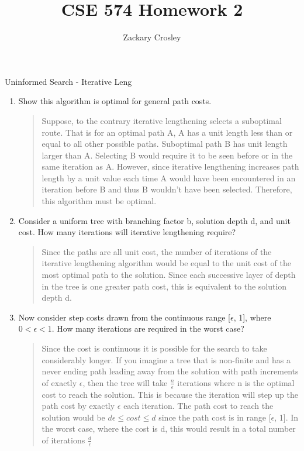 \documentclass[11pt]{article}
\newenvironment{problem}[2][Problem]{\begin{trivlist}
\item[\hskip \labelsep {\bfseries #1}\hskip \labelsep {\bfseries #2.}]}{\end{trivlist}}
\begin{document}
\title{CSE 574 Homework 2}
\author{Zackary Crosley}
\maketitle

\begin{problem}{1}
	Uninformed Search - Iterative Leng
	\begin{enumerate}
		\item Show this algorithm is optimal for general path costs.
		
		\begin{verse}
			Suppose, to the contrary iterative lengthening selects a suboptimal route. That is for an optimal path A, A has a unit length less than or equal to all other possible paths. Suboptimal path B has unit length larger than A. Selecting B would require it to be seen before or in the same iteration as A. However, since iterative lengthening increases path length by a unit value each time A would have been encountered in an iteration before B and thus B wouldn't have been selected. Therefore, this algorithm must be optimal.
		\end{verse}
		\item Consider a uniform tree with branching factor b, solution depth d, and unit cost. How many iterations will iterative lengthening require?
		\begin{verse}
			Since the paths are all unit cost, the number of iterations of the iterative lengthening algorithm would be equal to the unit cost of the most optimal path to the solution. Since each successive layer of depth in the tree is one greater path cost, this is equivalent to the solution depth d.
		\end{verse}
		\item Now consider step costs drawn from the continuous range [$\epsilon$, 1], where $0 < \epsilon < 1$. How many iterations are required in the worst case?
		\begin{verse}
			Since the cost is continuous it is possible for the search to take considerably longer. If you imagine a tree that is non-finite and has a never ending path leading away from the solution with path increments of exactly $\epsilon$, then the tree will take $\frac{n}{\epsilon}$ iterations where n is the optimal cost to reach the solution. This is because the iteration will step up the path cost by exactly $\epsilon$ each iteration. The path cost to reach the solution would be $d\epsilon \leq cost \leq d$ since the path cost is in range [$\epsilon$, 1]. In the worst case, where the cost is d, this would result in a total number of iterations $\frac{d}{\epsilon}$
		\end{verse}
	\end{enumerate}
\end{problem}
\end{document}
